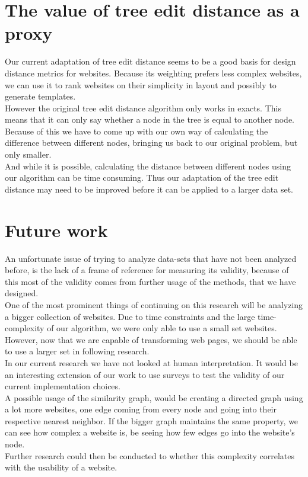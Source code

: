 \section{The value of tree edit distance as a proxy}
Our current adaptation of tree edit distance seems to be a good basis for design distance metrics for websites. Because its weighting prefers less complex websites, we can use it to rank websites on their simplicity in layout and possibly to generate templates.
\\However the original tree edit distance algorithm only works in exacts. This means that it can only say whether a node in the tree is equal to another node. Because of this we have to come up with our own way of calculating the difference between different nodes, bringing us back to our original problem, but only smaller.
\\And while it is possible, calculating the distance between different nodes using our algorithm can be time consuming. Thus our adaptation of the tree edit distance may need to be improved before it can be applied to a larger data set.

\section{Future work}
An unfortunate issue of trying to analyze data-sets that have not been analyzed before, is the lack of a frame of reference for measuring its validity, because of this most of the validity comes from further usage of the methods, that we have designed.
\\ One of the most prominent things of continuing on this research will be analyzing a bigger collection of websites. Due to time constraints and the large time-complexity of our algorithm, we were only able to use a small set websites. However, now that we are capable of transforming web pages, we should be able to use a larger set in following research.
\\ In our current research we have not looked at human interpretation. It would be an interesting extension of our work to use surveys to test the validity of our current implementation choices.
\\ A possible usage of the similarity graph, would be creating a directed graph using a lot more websites, one edge coming from every node and going into their respective nearest neighbor. If the bigger graph maintains the same property, we can see how complex a website is, be seeing how few edges go into the website's node.
\\ Further research could then be conducted to whether this complexity correlates with the usability of a website.